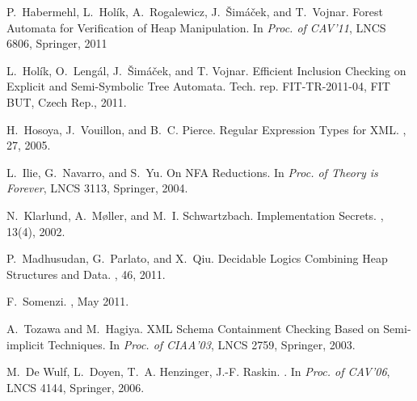\documentclass[draft]{llncs}
\begin{document}
{\begin{thebibliography}{10}
P.~Habermehl, L.~Hol{\'i}k, A.~Rogalewicz, J.~{\v S}im{\'a}{\v c}ek, and
  T.~Vojnar.
\newblock Forest Automata for Verification of Heap Manipulation.
\newblock In {\em Proc. of CAV'11}, LNCS 6806, Springer, 2011

L.~Hol\'{i}k, O.~Leng\'{a}l, J.~\v{S}im\'{a}\v{c}ek, and T. Vojnar.
\newblock Efficient Inclusion Checking on Explicit and Semi-Symbolic Tree
  Automata.
\newblock Tech. rep. FIT-TR-2011-04, FIT BUT, Czech Rep., 2011.

H.~Hosoya, J.~Vouillon, and B.~C. Pierce.
\newblock Regular Expression Types for {XML}.
, 27, 2005.

L.~Ilie, G.~Navarro, and S.~Yu.
\newblock On {NFA} Reductions.
\newblock In {\em Proc. of Theory is Forever}, LNCS 3113, Springer, 2004.

N.~Klarlund, A.~M\o{}ller, and M.~I. Schwartzbach.
 Implementation Secrets.
,
  13(4), 2002.

P.~Madhusudan, G.~Parlato, and X.~Qiu.
\newblock Decidable Logics Combining Heap Structures and Data.
, 46, 2011.

F.~Somenzi.
, May 2011.

A.~Tozawa and M.~Hagiya.
\newblock XML Schema Containment Checking Based on Semi-implicit Techniques.
\newblock In {\em Proc. of CIAA'03}, LNCS 2759, Springer, 2003.

M.~De Wulf, L.~Doyen, T.~A. Henzinger, J.-F. Raskin.
.
\newblock In {\em Proc. of CAV'06}, LNCS 4144, Springer, 2006.

\end{thebibliography}
}

\end{document}

